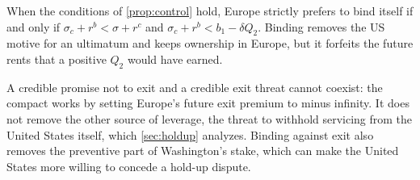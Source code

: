 \begin{remark}\label{rem:bind}
When the conditions of \cref{prop:control} hold, Europe strictly prefers to bind itself if and only if $\sigma_c + r^b < \sigma + r^c$ and $\sigma_c + r^b < b_1 - \delta Q_2$. Binding removes the US motive for an ultimatum and keeps ownership in Europe, but it forfeits the future rents that a positive $Q_2$ would have earned.
\end{remark}

A credible promise not to exit and a credible exit threat cannot coexist: the compact works by setting Europe's future exit premium to minus infinity. It does not remove the other source of leverage, the threat to withhold servicing from the United States itself, which \cref{sec:holdup} analyzes. Binding against exit also removes the preventive part of Washington's stake, which can make the United States more willing to concede a hold-up dispute.
